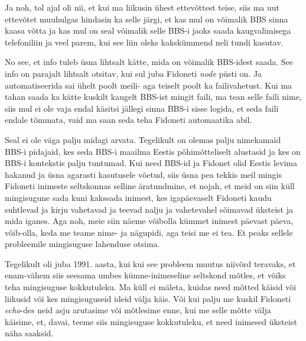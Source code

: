 Ja noh, tol ajal oli nii, et kui ma liikusin ühest ettevõttest teise, siis 
ma uut ettevõtet muuhulgas hindasin ka selle järgi, et kas mul on võimalik 
BBS sinna kaasa võtta ja kas mul on seal võimalik selle BBS-i jaoks saada  
kaugvalimisega telefoniliin ja veel parem, kui see liin oleks  kakskümmend neli 
tundi kasutav.


No see, et info tuleb üsna lihtsalt kätte, mida on võimalik BBS-idest saada. 
See info on parajalt lihtsalt otsitav, kui sul juba Fidoneti \emph{node} püsti 
on. Ja automatiseerida sai ühelt poolt meili-  aga teiselt poolt ka 
failivahetust. Kui ma tahan saada ka kätte kuskilt kaugelt BBS-ist mingit 
faili, ma tean selle faili nime, siis mul ei ole vaja endal käsitsi jällegi 
sinna BBS-i sisse logida, et seda faili endale tõmmata, vaid ma saan seda teha 
Fidoneti automaatika abil.


Seal ei ole väga palju midagi arvata. Tegelikult on olemas palju nimekamaid 
BBS-i pidajaid, kes seda  BBS-i maailma Eestis põhimõtteliselt  alustasid ja 
kes on BBS-i kontekstis palju tuntumad. Kui need BBS-id ja Fidonet  olid Eestis 
levima hakanud ja üsna agarasti kasutusele võetud, siis üsna pea tekkis meil 
mingis Fidoneti inimeste seltskonnas  selline äratundmine, et nojah, et meid on 
siin küll mingisugune sada kuni kakssada inimest, kes igapäevaselt   Fidoneti 
kaudu suhtlevad ja kirju vahetavad ja teevad nalju ja vahetevahel sõimavad 
üksteist ja mida iganes. Aga noh, meie siin  näeme võibolla kümmet inimest päevast 
päeva, võib-olla, keda me teame nime- ja nägupidi, aga teisi me ei tea. Et 
peaks sellele probleemile mingisuguse lahenduse otsima. 

Tegelikult oli juba 1991. aasta, kui kui see probleem muutus niivõrd teravaks, 
et enam-vähem siis seesama  umbes kümne-inimeseline seltskond mõtles, et võiks 
teha mingisuguse kokkutuleku. Ma küll ei mäleta, kuidas need mõtted käisid või 
liikusid või kes mingisuguseid ideid välja käis. Või kui palju me kuskil 
Fidoneti \emph{echo}-des neid asju arutasime või mõtlesime enne, kui me selle 
mõtte välja käisime, et, davai, teeme siis mingisuguse kokkutuleku, et need inimesed
üksteist näha saaksid.


